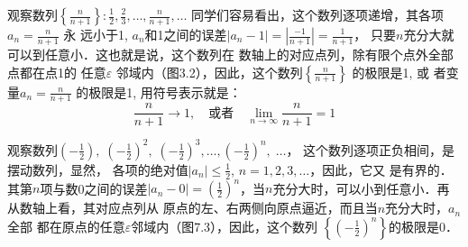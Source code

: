 \begin{example}
观察数列$\left\{\frac{n}{n+1}\right\}: \frac{1}{2},\frac{2}{3},\ldots,\frac{n}{n+1},\ldots$
同学们容易看出，这个数列逐项递增，其各项$a_n=\frac{n}{n+1}$
永
远小于1, $a_n$和1之间的误差$|a_n-1|=\left|\frac{-1}{n+1}\right|=\frac{1}{n+1}$，
只要$n$充分大就可以到任意小．这也就是说，这个数列在
数轴上的对应点列，除有限个点外全部点都在点1的 任意$\varepsilon$
邻域内（图3.2），因此，这个数列$\left\{\frac{n}{n+1}\right\}$
的极限是1, 或
者变量$a_n=\frac{n}{n+1}$
的极限是1, 用符号表示就是：
\[\frac{n}{n+1}\to 1,\quad \text{或者}\quad \lim_{n\to\infty}\frac{n}{n+1}=1\]
\begin{figure}[htp]
    \centering
{}  
    \caption{}
\end{figure}
\end{example}

\begin{example}
    观察数列$\left(-\frac{1}{2}\right),\; \left(-\frac{1}{2}\right)^2,\; \left(-\frac{1}{2}\right)^3,\ldots,\left(-\frac{1}{2}\right)^n,\;\ldots$， 这个数列逐项正负相间，是摆动数列，显然，
    各项的绝对值$|a_n|\le\frac{1}{2}$, $n=1,2,3,\ldots$，因此，它又
    是有界的．其第$n$项与数0之间的误差$|a_n-0|=\left(\frac{1}{2}\right)^n$，当$n$充分大时，可以小到任意小．再从数轴上看，其对应点列从
    原点的左、右两侧向原点逼近，而且当$n$充分大时，$a_n$全部
    都在原点的任意$\varepsilon$邻域内（图7.3），因此，这个数列
$\left\{\left(-\frac{1}{2}\right)^n\right\}$的极限是0．
\begin{figure}[htp]
    \centering
    \caption{}
\end{figure}
\end{example}

